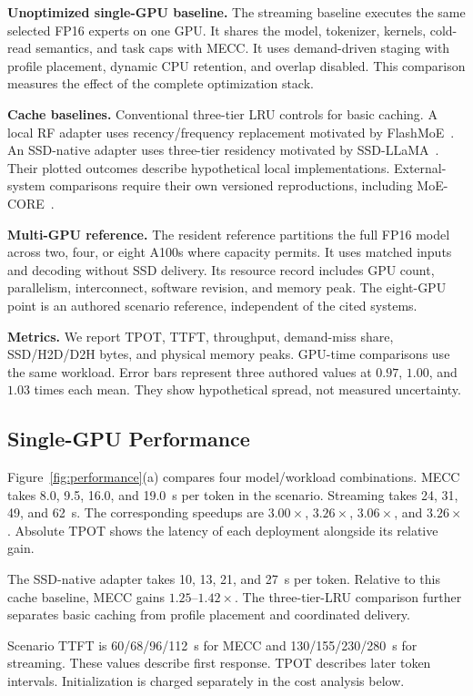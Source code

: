 \documentclass[conference,9pt,letterpaper]{IEEEtran}
\newcommand{\mecc}{\textsc{MECC}}
\begin{document}
\textbf{Unoptimized single-GPU baseline.} The streaming baseline executes the same selected FP16 experts on one GPU. It shares the model, tokenizer, kernels, cold-read semantics, and task caps with \mecc{}. It uses demand-driven staging with profile placement, dynamic CPU retention, and overlap disabled. This comparison measures the effect of the complete optimization stack.

\textbf{Cache baselines.} Conventional three-tier LRU controls for basic caching. A local RF adapter uses recency/frequency replacement motivated by FlashMoE~\cite{flashmoe}. An SSD-native adapter uses three-tier residency motivated by SSD-LLaMA~\cite{ssdllama}. Their plotted outcomes describe hypothetical local implementations. External-system comparisons require their own versioned reproductions, including MoE-CORE~\cite{core}.

\textbf{Multi-GPU reference.} The resident reference partitions the full FP16 model across two, four, or eight A100s where capacity permits. It uses matched inputs and decoding without SSD delivery. Its resource record includes GPU count, parallelism, interconnect, software revision, and memory peak. The eight-GPU point is an authored scenario reference, independent of the cited systems.

\textbf{Metrics.} We report TPOT, TTFT, throughput, demand-miss share, SSD/H2D/D2H bytes, and physical memory peaks. GPU-time comparisons use the same workload. Error bars represent three authored values at $0.97$, $1.00$, and $1.03$ times each mean. They show hypothetical spread, not measured uncertainty.

\subsection{Single-GPU Performance}
Figure~\ref{fig:performance}(a) compares four model/workload combinations. \mecc{} takes 8.0, 9.5, 16.0, and 19.0~s per token in the scenario. Streaming takes 24, 31, 49, and 62~s. The corresponding speedups are $3.00\times$, $3.26\times$, $3.06\times$, and $3.26\times$. Absolute TPOT shows the latency of each deployment alongside its relative gain.

The SSD-native adapter takes 10, 13, 21, and 27~s per token. Relative to this cache baseline, \mecc{} gains $1.25$--$1.42\times$. The three-tier-LRU comparison further separates basic caching from profile placement and coordinated delivery.

Scenario TTFT is 60/68/96/112~s for \mecc{} and 130/155/230/280~s for streaming. These values describe first response. TPOT describes later token intervals. Initialization is charged separately in the cost analysis below.
\end{document}

